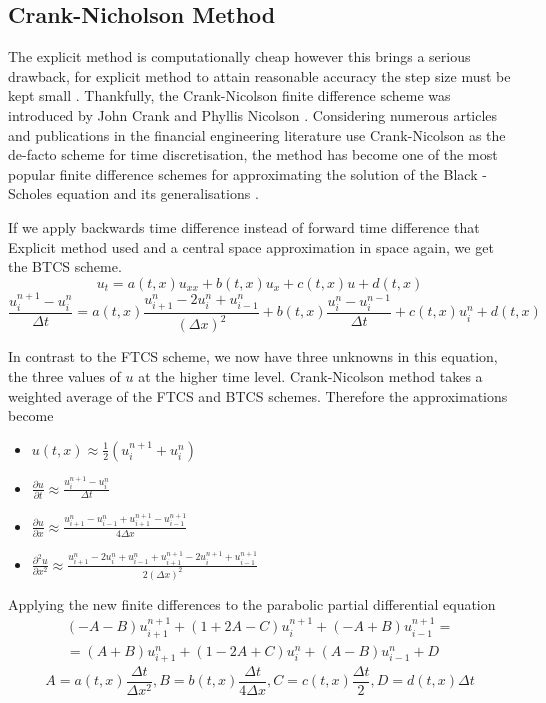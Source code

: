 \documentclass[12pt, oneside]{book}
\theoremstyle{plain}
\theoremstyle{definition}
\begin{document}
\subsection{Crank-Nicholson Method}
The explicit method is computationally cheap however this brings a serious drawback, for explicit method to attain reasonable accuracy the step size must be kept small \cite{gdsmith}. Thankfully, the Crank-Nicolson finite difference scheme was introduced by John Crank and Phyllis Nicolson \cite{cn}. Considering numerous articles and publications in the financial engineering literature use Crank-Nicolson as the de-facto scheme for time discretisation, the method has become one of the most popular finite difference schemes for approximating the solution of the Black - Scholes equation and its generalisations \cite{tavella}.

 If we apply backwards time difference instead of forward time difference that Explicit method used and a central space approximation in space again, we get the BTCS scheme. 
 \begin{equation}
 u_t  = a(t, x)  u_{xx} + b(t, x) u_x + c(t, x) u  + d(t, x)
\end{equation}
\begin{equation}
\frac{u^{n+1}_i - u^n_i}{\Delta t}  = a(t, x)  \frac{u^n_{i+1}- 2u^n_i + u^n_{i-1}}{(\Delta x)^2}  + b(t, x)  \frac{u^{n}_i - u^{n-1}_i}{\Delta t}  + c(t, x)  u^n_i + d(t, x)
\end{equation}

In contrast to the FTCS scheme, we now have three unknowns in this equation, the three values of $u$ at the higher time level.  Crank-Nicolson method takes a weighted average of the FTCS and BTCS schemes. Therefore the approximations become
\begin{itemize}
 \item $ u(t,x) \approx \frac{1}{2} ( u^{n+1}_i +  u^n_i) $
 \item $   \frac{\partial u}{\partial t} \approx \frac{u^{n+1}_i - u^n_i}{\Delta t} $
 \item $   \frac{\partial u}{\partial x} \approx \frac{u^n_{i+1} - u^n_{i-1} + u^{n+1}_{i+1} - u^{n+1}_{i-1}}{4\Delta x} $
 \item $ \frac{\partial^2 u}{\partial x^2} \approx \frac{u^n_{i+1}- 2u^n_i + u^n_{i-1} + u^{n+1}_{i+1}- 2u^{n+1}_i + u^{n+1}_{i-1}}{2(\Delta x)^2} $
\end{itemize}

Applying the new finite differences to the parabolic partial differential equation
\begin{multline}
 (-A -B) u^{n+1}_{i+1} + (1 + 2A - C) u^{n+1}_i + (-A + B) u^{n+1}_{i-1} =  \\
=  (A+B) u^{n}_{i+1} + (1 - 2A + C) u^{n}_i + (A - B) u^{n}_{i-1} + D
\end{multline}
$$ A = a(t,x) \frac{\Delta t}{\Delta x^2},  B = b(t,x) \frac{\Delta t}{4\Delta x}, C = c(t,x) \frac{\Delta t}{2},  D = d(t,x) \Delta t $$ 
\end{document}
